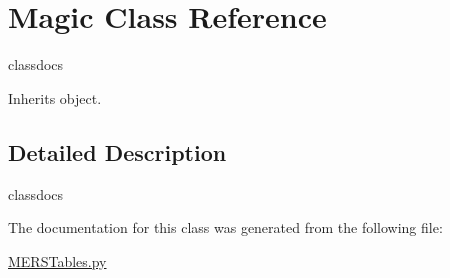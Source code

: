 \hypertarget{classrpgToolDefinitions_1_1MERSTables_1_1Magic}{}\section{Magic Class Reference}
\label{classrpgToolDefinitions_1_1MERSTables_1_1Magic}


classdocs  




Inherits object.



\subsection{Detailed Description}
classdocs 

The documentation for this class was generated from the following file\+:\begin{DoxyCompactItemize}
\item 
\hyperlink{MERSTables_8py}{M\+E\+R\+S\+Tables.\+py}\end{DoxyCompactItemize}
